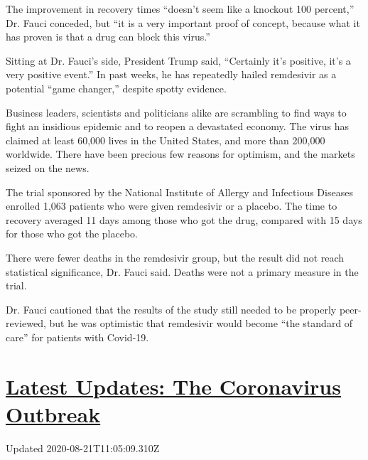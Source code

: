 The improvement in recovery times ``doesn't seem like a knockout 100
percent,'' Dr. Fauci conceded, but ``it is a very important proof of
concept, because what it has proven is that a drug can block this
virus.''

Sitting at Dr. Fauci's side, President Trump said, ``Certainly it's
positive, it's a very positive event.'' In past weeks, he has repeatedly
hailed remdesivir as a potential ``game changer,'' despite spotty
evidence.

Business leaders, scientists and politicians alike are scrambling to
find ways to fight an insidious epidemic and to reopen a devastated
economy. The virus has claimed at least 60,000 lives in the United
States, and more than 200,000 worldwide. There have been precious few
reasons for optimism, and the markets seized on the news.

The trial sponsored by the National Institute of Allergy and Infectious
Diseases enrolled 1,063 patients who were given remdesivir or a placebo.
The time to recovery averaged 11 days among those who got the drug,
compared with 15 days for those who got the placebo.

There were fewer deaths in the remdesivir group, but the result did not
reach statistical significance, Dr. Fauci said. Deaths were not a
primary measure in the trial.

Dr. Fauci cautioned that the results of the study still needed to be
properly peer-reviewed, but he was optimistic that remdesivir would
become ``the standard of care'' for patients with Covid-19.

\hypertarget{latest-updates-the-coronavirus-outbreak}{%
\section{\texorpdfstring{\href{https://www.nytimes3xbfgragh.onion/2020/08/21/world/covid-19-coronavirus.html?action=click\&pgtype=Article\&state=default\&region=MAIN_CONTENT_1\&context=storylines_live_updates}{Latest
Updates: The Coronavirus
Outbreak}}{Latest Updates: The Coronavirus Outbreak}}\label{latest-updates-the-coronavirus-outbreak}}

Updated 2020-08-21T11:05:09.310Z

